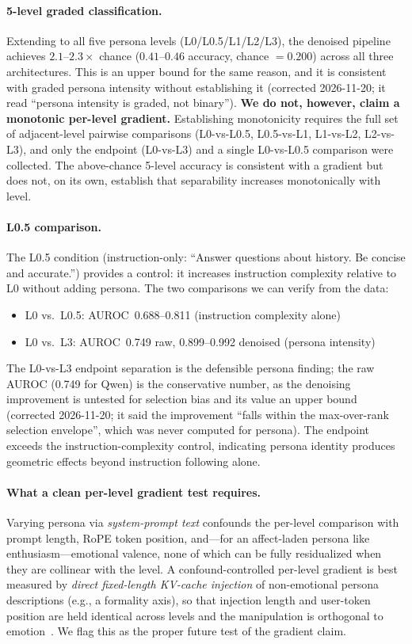 \documentclass[11pt,a4paper]{article}
\begin{document}
\paragraph{5-level graded classification.} Extending to all five persona
levels (L0/L0.5/L1/L2/L3), the denoised pipeline achieves $2.1$--$2.3\times$
chance ($0.41$--$0.46$ accuracy, chance $= 0.200$) across all three
architectures. This is an upper bound for the same reason, and it is
consistent with graded persona intensity without establishing it (corrected
2026-11-20; it read ``persona intensity is graded, not binary''). \textbf{We do not,
however, claim a monotonic per-level gradient.} Establishing monotonicity
requires the full set of adjacent-level pairwise comparisons (L0-vs-L0.5,
L0.5-vs-L1, L1-vs-L2, L2-vs-L3), and only the endpoint (L0-vs-L3) and a single
L0-vs-L0.5 comparison were collected. The above-chance 5-level accuracy is
consistent with a gradient but does not, on its own, establish that
separability increases monotonically with level.

\paragraph{L0.5 comparison.} The L0.5 condition (instruction-only:
``Answer questions about history. Be concise and accurate.'') provides a
control: it increases instruction complexity relative to L0 without adding
persona. The two comparisons we can verify from the data:
\begin{itemize}[nosep]
    \item L0 vs.\ L0.5: AUROC~0.688--0.811 (instruction complexity alone)
    \item L0 vs.\ L3: AUROC~0.749 raw, 0.899--0.992 denoised (persona intensity)
\end{itemize}
The L0-vs-L3 endpoint separation is the defensible persona finding; the raw
AUROC (0.749 for Qwen) is the conservative number, as the denoising
improvement is untested for selection bias and its value an upper bound
(corrected 2026-11-20; it said the improvement ``falls within the
max-over-rank selection envelope'', which was never computed for persona). The endpoint exceeds the instruction-complexity
control, indicating persona identity produces geometric effects beyond
instruction following alone.

\paragraph{What a clean per-level gradient test requires.} Varying persona
via \emph{system-prompt text} confounds the per-level comparison with prompt
length, RoPE token position, and---for an affect-laden persona like
enthusiasm---emotional valence, none of which can be fully residualized when
they are collinear with the level. A confound-controlled per-level gradient
is best measured by \emph{direct fixed-length KV-cache injection} of
non-emotional persona descriptions (e.g., a formality axis), so that injection
length and user-token position are held identical across levels and the
manipulation is orthogonal to emotion~\citep{nexus2026kv}. We flag this as the
proper future test of the gradient claim.
\end{document}
